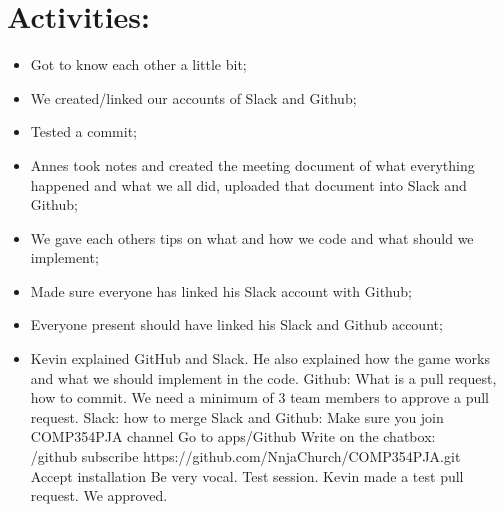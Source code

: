 \documentclass[12pt]{article}
\begin{document}
\section{Activities:} 
\begin{itemize}
    \item Got to know each other a little bit;
    \item We created/linked our accounts of Slack and Github;
    \item Tested a commit;
    \item Annes took notes and created the meeting document of what everything happened and what we all did, uploaded that document into Slack and Github;
    \item We gave each others tips on what and how we code and what should we implement;
    \item Made sure everyone has linked his Slack account with Github;\\
    \item Everyone present should have linked his Slack and Github account;\\
    \item Kevin explained GitHub and Slack. He also explained how the game works and what we should implement in the code.
    Github: What is a pull request, how to commit. 
    We need a minimum of 3 team members to approve a pull request. 
    Slack: how to merge Slack and Github: 
    Make sure you join COMP354PJA channel
    Go to apps/Github
    Write on the chatbox: \\
    /github subscribe https://github.com/NnjaChurch/COMP354PJA.git\\
    Accept installation
    Be very vocal. 
    Test session. Kevin made a test pull request. We approved.
    \clearpage
\end{itemize}
\end{document}
